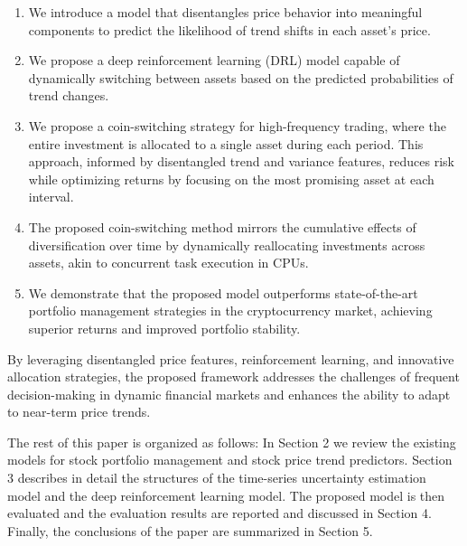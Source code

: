 \begin{enumerate}
	\item We introduce a model that disentangles price behavior into meaningful components to predict the likelihood of trend shifts in each asset's price.
	\item We propose a deep reinforcement learning (DRL) model capable of dynamically switching between assets based on the predicted probabilities of trend changes.
	\item We propose a coin-switching strategy for high-frequency trading, where the entire investment is allocated to a single asset during each period. This approach, informed by disentangled trend and variance features, reduces risk while optimizing returns by focusing on the most promising asset at each interval.
	\item The proposed coin-switching method mirrors the cumulative effects of diversification over time by dynamically reallocating investments across assets, akin to concurrent task execution in CPUs.
	\item We demonstrate that the proposed model outperforms state-of-the-art portfolio management strategies in the cryptocurrency market, achieving superior returns and improved portfolio stability.
\end{enumerate}

By leveraging disentangled price features, reinforcement learning, and innovative allocation strategies, the proposed framework addresses the challenges of frequent decision-making in dynamic financial markets and enhances the ability to adapt to near-term price trends.

The rest of this paper is organized as follows: In Section 2 we review the existing models for stock portfolio management and stock price trend predictors. Section 3 describes in detail the structures of the time-series uncertainty estimation model and the deep reinforcement learning model. The proposed model is then evaluated and the evaluation results are reported and discussed in Section 4. Finally, the conclusions of the paper are summarized in Section 5.
